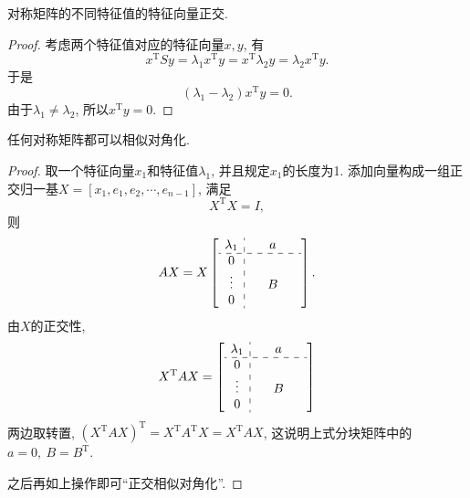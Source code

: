 \begin{theorem}
    对称矩阵的不同特征值的特征向量正交.
\end{theorem}
\begin{proof}
     考虑两个特征值对应的特征向量$x, y$, 有
      \begin{equation}
        x^{\mathrm{T}}S y  =\lambda_1 x^{\mathrm{T}} y = x^{\mathrm{T}} \lambda_2 y = \lambda_2 x^{\mathrm{T}} y.
      \end{equation}
      于是
      \begin{equation}
        \left( \lambda_1 - \lambda_2 \right) x^{\mathrm{T}} y = 0.
      \end{equation}
      由于$\lambda_1 \neq \lambda_2$, 所以$x^{\mathrm{T}} y = 0$.
\end{proof}

\begin{theorem}
    任何对称矩阵都可以相似对角化.
\end{theorem}
\begin{proof}
    取一个特征向量$x_1$和特征值$\lambda_1$, 并且规定$x_1$的长度为1. 添加向量构成一组正交归一基$X = \left[ x_1, e_1,e_2,\cdots,e_{n-1} \right] $, 满足
    \begin{equation}
      X^{\mathrm{T}}X = I,
    \end{equation}
    则
    \begin{equation}
      A X = X 
      \left[
        \begin{array}{c:ccc}
            \lambda_1 & \  & a & \  \\
            \hdashline
            0 & & & \\
            \vdots & & B & \\
            0 & & & \\
        \end{array} 
       \right] .
    \end{equation}
    由$X$的正交性, 
    \begin{equation}
      X^{\mathrm{T}} A X = \left[
        \begin{array}{c:ccc}
            \lambda_1 & \  & a & \  \\
            \hdashline
            0 & & & \\
            \vdots & & B & \\
            0 & & & \\
        \end{array} 
       \right] 
    \end{equation}
    两边取转置, $\left( X^{\mathrm{T}} A X \right) ^{\mathrm{T}} = X^{\mathrm{T}} A^{\mathrm{T}} X = X ^{\mathrm{T}} AX$, 这说明上式分块矩阵中的$a = 0,\ B = B^{\mathrm{T}}$.

    之后再如上操作即可``正交相似对角化''.
\end{proof}